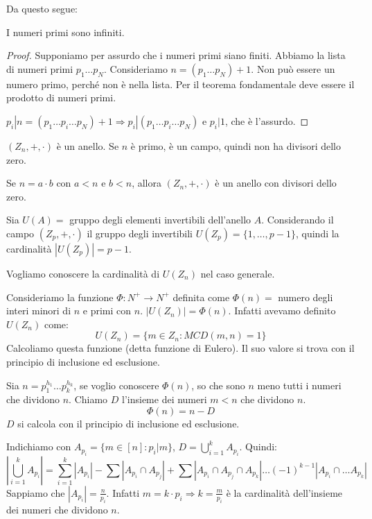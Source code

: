 Da questo segue:
\begin{theorem}
I numeri primi sono infiniti.
\end{theorem}
\begin{proof}
Supponiamo per assurdo che i numeri primi siano finiti. Abbiamo la lista di numeri primi $p_1 \dots p_N$. Consideriamo $n = (p_1 \dots p_N) + 1$. Non pu\`o essere un numero primo, perch\'e non \`e nella lista. Per il teorema fondamentale deve essere il prodotto di numeri primi.

$p_i | n = (p_1 \dots p_i \dots p_N) + 1 \Rightarrow p_i | (p_1 \dots p_i \dots p_N)$ e $p_i | 1$, che \`e l'assurdo.
\end{proof}

$(Z_n, +, \cdot)$ \`e un anello. Se $n$ \`e primo, \`e un campo, quindi non ha divisori dello zero.

Se $n = a \cdot b$ con $a < n$ e $b < n$, allora $(Z_n, +, \cdot)$ \`e un anello con divisori dello zero.

Sia $U(A) =$ gruppo degli elementi invertibili dell'anello $A$. Considerando il campo $(Z_p, +, \cdot)$ il gruppo degli invertibili $U(Z_p) = \{1, \dots,  p-1\}$, quindi la cardinalit\`a $|U(Z_p)| = p-1$.

Vogliamo conoscere la cardinalit\`a di $U(Z_n)$ nel caso generale.

Consideriamo la funzione $\Phi : N^+ \to N^+$ definita come $\Phi (n) =$ numero degli interi minori di $n$ e primi con $n$. $|U(Z_n)| = \Phi(n)$. Infatti avevamo definito $U(Z_n)$ come:
\[
U(Z_n) = \{ m \in Z_n : MCD(m, n) = 1 \}
\]
Calcoliamo questa funzione (detta funzione di Eulero). Il suo valore si trova con il principio di inclusione ed esclusione.

Sia $n = p_{1}^{h_1} \dots p_{k}^{h_k}$, se voglio conoscere $\Phi(n)$, so che sono $n$ meno tutti i numeri che dividono $n$. Chiamo $D$ l'insieme dei numeri $m < n$ che dividono $n$.
\[
\Phi(n) = n - D
\]
$D$ si calcola con il principio di inclusione ed esclusione. 

Indichiamo con $A_{p_i} = \{ m \in [n] : p_i | m \}$, $D = \bigcup_{i = 1}^{k} A_{p_i}$. Quindi:
\[
|\bigcup_{i = 1}^{k} A_{p_i}| = \sum_{i = 1}^{k} |A_{p_i}| - \sum |A_{p_i} \cap A_{p_j}| + \sum |A_{p_i} \cap A_{p_j} \cap A_{p_k}| \dots (-1)^{k-1} |A_{p_i} \cap \dots A_{p_k} | 
\]
Sappiamo che $|A_{p_i}| = \frac{n}{p_i}$. Infatti $m = k \cdot p_i \Rightarrow k = \frac{m}{p_i}$ \`e la cardinalit\`a dell'insieme dei numeri che dividono $n$.

